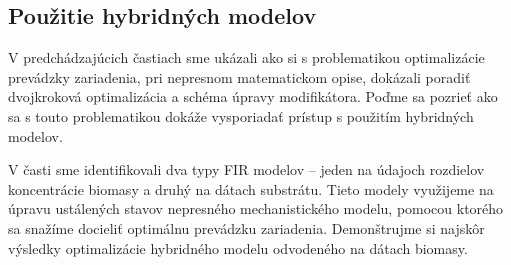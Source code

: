 \subsection{Použitie hybridných modelov}
V predchádzajúcich častiach sme ukázali ako si s problematikou optimalizácie prevádzky zariadenia, pri nepresnom matematickom opise, dokázali poradiť dvojkroková optimalizácia a schéma úpravy modifikátora. Poďme sa pozrieť ako sa s touto problematikou dokáže vysporiadať prístup s použitím hybridných modelov.

V časti  sme identifikovali dva typy FIR modelov -- jeden na údajoch rozdielov koncentrácie biomasy a druhý na dátach substrátu. Tieto modely využijeme na úpravu ustálených stavov nepresného mechanistického modelu, pomocou ktorého sa snažíme docieliť optimálnu prevádzku zariadenia. Demonštrujme si najskôr výsledky optimalizácie hybridného modelu odvodeného na dátach biomasy.

